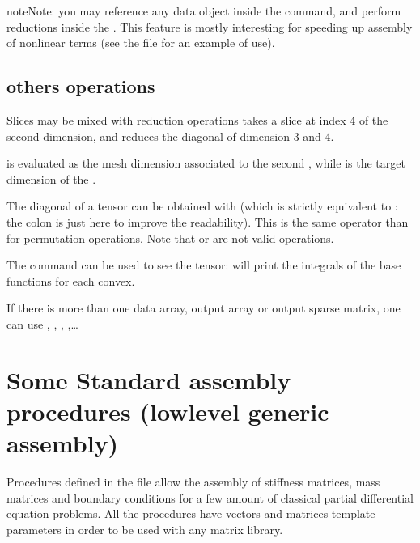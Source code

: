 \documentclass[a4paper,11pt,english]{sphinxmanual}
\begin{document}
\begin{sphinxadmonition}{note}{Note:}
you may reference any data object inside the  command, and perform
reductions inside the . This feature is mostly interesting for
speeding up assembly of nonlinear terms (see the file
 for an example of use).
\end{sphinxadmonition}


\section{others operations}
\label{\detokenize{userdoc/gasm_low:others-operations}}
Slices may be mixed with reduction operations  takes a slice at
index 4 of the second dimension, and reduces the diagonal of dimension 3 and 4.

 is evaluated as the mesh dimension associated to the second ,
while  is the target dimension of the .

The diagonal of a tensor can be obtained with  (which is strictly
equivalent to : the colon is just here to improve the readability).
This is the same operator than for permutation operations. Note that
 or  are not valid operations.

The  command can be used to see the tensor: 
will print the integrals of the base functions for each convex.

If there is more than one data array, output array or output sparse
matrix, one can use , , , ,…


\chapter{Some Standard assembly procedures (low\sphinxhyphen{}level generic assembly)}
\label{\detokenize{userdoc/asm:some-standard-assembly-procedures-low-level-generic-assembly}}\label{\detokenize{userdoc/asm:ud-asm}}\label{\detokenize{userdoc/asm::doc}}
Procedures defined in the file  allow the
assembly of stiffness matrices, mass matrices and boundary conditions for a few
amount of classical partial differential equation problems. All the procedures
have vectors and matrices template parameters in order to be used with any matrix library.
\end{document}
